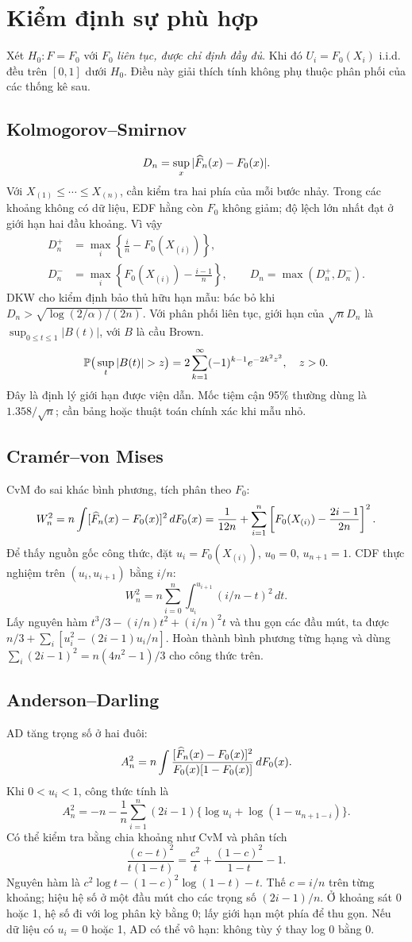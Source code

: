 \section{Kiểm định sự phù hợp}
Xét $H_0:F=F_0$ với $F_0$ \emph{liên tục, được chỉ định đầy đủ}.
Khi đó $U_i=F_0(X_i)$ i.i.d. đều trên $[0,1]$ dưới $H_0$.
Điều này giải thích tính không phụ thuộc phân phối của các thống kê sau.

\subsection{Kolmogorov--Smirnov}
\[
D_n=\sup_x|\widehat F_n(x)-F_0(x)|.
\]
Với $X_{(1)}\leq\cdots\leq X_{(n)}$, cần kiểm tra hai phía của mỗi
bước nhảy. Trong các khoảng không có dữ liệu, EDF hằng còn $F_0$ không
giảm; độ lệch lớn nhất đạt ở giới hạn hai đầu khoảng. Vì vậy
\begin{align*}
D_n^+&=\max_i\left\{\frac in-F_0(X_{(i)})\right\},\\
D_n^-&=\max_i\left\{F_0(X_{(i)})-\frac{i-1}n\right\},\qquad
\boxed{D_n=\max(D_n^+,D_n^-).}
\end{align*}
DKW cho kiểm định bảo thủ hữu hạn mẫu: bác bỏ khi
$D_n>\sqrt{\log(2/\alpha)/(2n)}$.
Với phân phối liên tục, giới hạn của $\sqrt nD_n$ là
$\sup_{0\leq t\leq1}|B(t)|$, với $B$ là cầu Brown.
\[
\Pp\big(\sup_t|B(t)|>z\big)
=2\sum_{k=1}^{\infty}(-1)^{k-1}e^{-2k^2z^2},\quad z>0.
\]
Đây là định lý giới hạn được viện dẫn. Mốc tiệm cận 95\% thường dùng
là $1.358/\sqrt n$; cần bảng hoặc thuật toán chính xác khi mẫu nhỏ.

\subsection{Cramér--von Mises}
CvM đo sai khác bình phương, tích phân theo $F_0$:
\[
W_n^2=n\int[\widehat F_n(x)-F_0(x)]^2\,dF_0(x)
=\frac1{12n}+\sum_{i=1}^n
\left[F_0(X_{(i)})-\frac{2i-1}{2n}\right]^2.
\]
Để thấy nguồn gốc công thức, đặt $u_i=F_0(X_{(i)})$, $u_0=0$,
$u_{n+1}=1$. CDF thực nghiệm trên $(u_i,u_{i+1})$ bằng $i/n$:
\[
W_n^2=n\sum_{i=0}^n\int_{u_i}^{u_{i+1}}(i/n-t)^2\,dt.
\]
Lấy nguyên hàm $t^3/3-(i/n)t^2+(i/n)^2t$ và thu gọn các đầu mút,
ta được $n/3+\sum_i[u_i^2-(2i-1)u_i/n]$.
Hoàn thành bình phương từng hạng và dùng
$\sum_i(2i-1)^2=n(4n^2-1)/3$ cho công thức trên.

\subsection{Anderson--Darling}
AD tăng trọng số ở hai đuôi:
\[
A_n^2=n\int\frac{[\widehat F_n(x)-F_0(x)]^2}
{F_0(x)[1-F_0(x)]}\,dF_0(x).
\]
Khi $0<u_i<1$, công thức tính là
\[
\boxed{A_n^2=-n-\frac1n\sum_{i=1}^n(2i-1)
\{\log u_i+\log(1-u_{n+1-i})\}.}
\]
Có thể kiểm tra bằng chia khoảng như CvM và phân tích
\[
\frac{(c-t)^2}{t(1-t)}
=\frac{c^2}{t}+\frac{(1-c)^2}{1-t}-1.
\]
Nguyên hàm là $c^2\log t-(1-c)^2\log(1-t)-t$.
Thế $c=i/n$ trên từng khoảng; hiệu hệ số ở một đầu mút cho các trọng số
$(2i-1)/n$. Ở khoảng sát 0 hoặc 1, hệ số đi với log phân kỳ bằng 0;
lấy giới hạn một phía để thu gọn. Nếu dữ liệu có $u_i=0$ hoặc 1,
AD có thể vô hạn: không tùy ý thay log 0 bằng 0.

